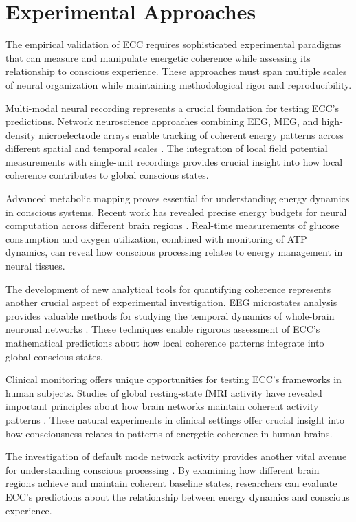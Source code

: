 \section{Experimental Approaches}

The empirical validation of ECC requires sophisticated experimental paradigms that can measure and manipulate energetic coherence while assessing its relationship to conscious experience. These approaches must span multiple scales of neural organization while maintaining methodological rigor and reproducibility.

Multi-modal neural recording represents a crucial foundation for testing ECC's predictions. Network neuroscience approaches combining EEG, MEG, and high-density microelectrode arrays enable tracking of coherent energy patterns across different spatial and temporal scales \cite{Bassett2017}. The integration of local field potential measurements with single-unit recordings provides crucial insight into how local coherence contributes to global conscious states.

Advanced metabolic mapping proves essential for understanding energy dynamics in conscious systems. Recent work has revealed precise energy budgets for neural computation across different brain regions \cite{Howarth2012}. Real-time measurements of glucose consumption and oxygen utilization, combined with monitoring of ATP dynamics, can reveal how conscious processing relates to energy management in neural tissues.

The development of new analytical tools for quantifying coherence represents another crucial aspect of experimental investigation. EEG microstates analysis provides valuable methods for studying the temporal dynamics of whole-brain neuronal networks \cite{Michel2018}. These techniques enable rigorous assessment of ECC's mathematical predictions about how local coherence patterns integrate into global conscious states.

Clinical monitoring offers unique opportunities for testing ECC's frameworks in human subjects. Studies of global resting-state fMRI activity have revealed important principles about how brain networks maintain coherent activity patterns \cite{Scholvinck2013}. These natural experiments in clinical settings offer crucial insight into how consciousness relates to patterns of energetic coherence in human brains.

The investigation of default mode network activity provides another vital avenue for understanding conscious processing \cite{Raichle2015}. By examining how different brain regions achieve and maintain coherent baseline states, researchers can evaluate ECC's predictions about the relationship between energy dynamics and conscious experience.

